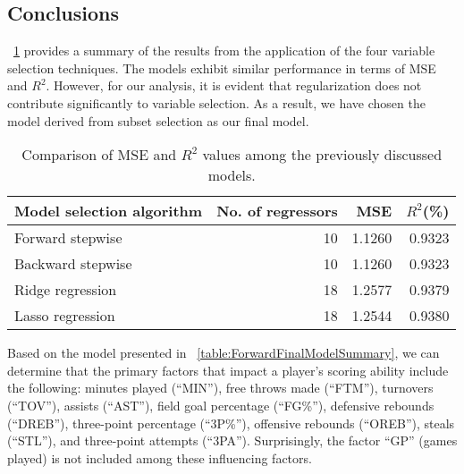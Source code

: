 \subsection{Conclusions}

\Tab~\ref{table:RegEvalParams} provides a summary of the results from the application of the four variable selection techniques.
The models exhibit similar performance in terms of MSE and $R^2$. 
However, for our analysis, it is evident that regularization does not contribute significantly to variable selection. 
As a result, we have chosen the model derived from subset selection as our final model.

\begin{table}[h]
	\centering
	\begin{tabular}{|| l | r | r | r ||} 
		\hline
		Model selection algorithm & No. of regressors & MSE & $R^2$(\%) \\
		\hline
		\hline
		Forward stepwise & 10 & 1.1260 & 0.9323 \\
		\hline
		Backward stepwise & 10 & 1.1260 & 0.9323 \\
		\hline
		Ridge regression & 18 & 1.2577 & 0.9379 \\
		\hline
		Lasso regression & 18 & 1.2544 & 0.9380 \\
		\hline
	\end{tabular}
	\caption{Comparison of MSE and $R^2$ values among the previously discussed models.}
	\label{table:RegEvalParams}
\end{table}

Based on the model presented in \Tab~\ref{table:ForwardFinalModelSummary}, we can determine that the primary factors that impact a player's scoring ability include the following: minutes played (``MIN''), free throws made (``FTM''), turnovers (``TOV''), assists (``AST''), field goal percentage (``FG\%''), defensive rebounds (``DREB''), three-point percentage (``3P\%''), offensive rebounds (``OREB''), steals (``STL''), and three-point attempts (``3PA'').
Surprisingly, the factor ``GP'' (games played) is not included among these influencing factors.
